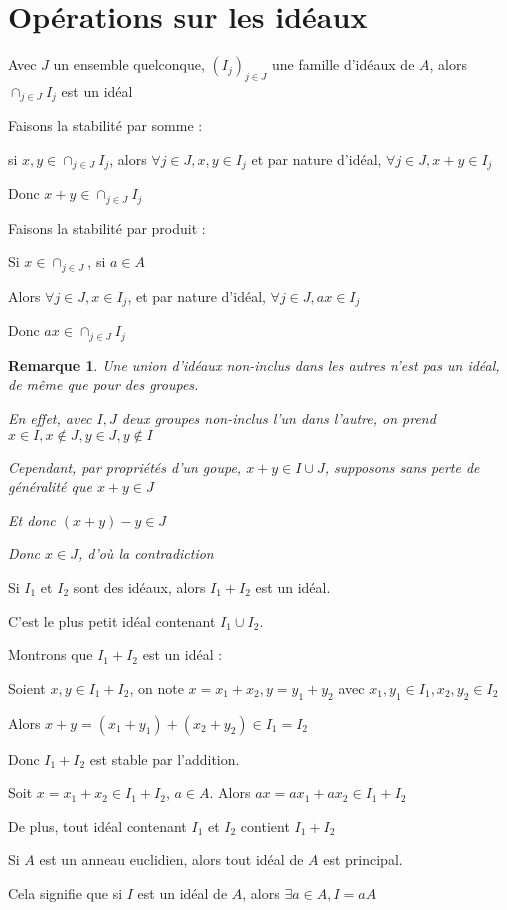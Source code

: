 \documentclass[a4paper,12pt]{book}
\newcommand{\Thr}[2]{\begin{tcolorbox}[sharp corners, colback=white,colframe=red!90!black!75, title=Théorème : #1]#2\end{tcolorbox}}
\newcommand{\Prop}[2]{\begin{tcolorbox}[sharp corners, colback=white,colframe=red!90!black!75, title=Proposition : #1]#2\end{tcolorbox}}
\newcommand{\Pre}[1]{\begin{tcolorbox}[sharp corners, colback=white,colframe=green!60!green!30!black!75, title=Preuve]#1\end{tcolorbox}}
\newtheorem{Rem}{Remarque}[section]
\begin{document}
\section{Opérations sur les idéaux}
\Prop{}{Avec $J$ un ensemble quelconque, $(I_j)_{j\in J}$ une famille d'idéaux de $A$, alors $\cap_{j\in J} I_j$ est un idéal}
\Pre{Faisons la stabilité par somme : \par si $x,y\in\cap_{j\in J}I_j$, alors $\forall j\in J, x,y\in I_j$ et par nature d'idéal, $\forall j\in J, x+y\in I_j$ \par Donc $x+y\in \cap_{j\in J}I_j$
\par Faisons la stabilité par produit : \par Si $x\in\cap_{j\in J}$, si $a\in A$ \par Alors $\forall j\in J, x\in I_j$, et par nature d'idéal, $\forall j\in J, ax\in I_j$ \par Donc $ax\in \cap_{j\in J}I_j$}
\begin{Rem}
Une union d'idéaux non-inclus dans les autres n'est pas un idéal, de même que pour des groupes.
\par En effet, avec $I,J$ deux groupes non-inclus l'un dans l'autre, on prend $x\in I, x\notin J, y\in J, y\notin I$ \par Cependant, par propriétés d'un goupe, $x+y\in I\cup J$, supposons sans perte de généralité que $x+y\in J$ \par Et donc $(x+y)-y\in J$ \par Donc $x\in J$, d'où la contradiction
\end{Rem}
\Prop{}{Si $I_1$ et $I_2$ sont des idéaux, alors $I_1+I_2$ est un idéal. \par C'est le plus petit idéal contenant $I_1\cup I_2$.}
\Pre{Montrons que $I_1+I_2$ est un idéal :
\par Soient $x,y\in I_1+I_2$, on note $x=x_1+x_2, y=y_1+y_2$ avec $x_1,y_1\in I_1, x_2, y_2\in I_2$ \par Alors $x+y = (x_1+y_1)+(x_2+y_2)\in I_1=I_2$ \par Donc $I_1+I_2$ est stable par l'addition. \par Soit $x = x_1+x_2\in I_1+I_2$, $a\in A$. Alors $ax = ax_1 + ax_2 \in I_1+I_2$
\par De plus, tout idéal contenant $I_1$ et $I_2$ contient $I_1+I_2$}
\Thr{}{Si $A$ est un anneau euclidien, alors tout idéal de $A$ est principal.
\par Cela signifie que si $I$ est un idéal de $A$, alors $\exists a\in A, I = aA$}
\end{document}
